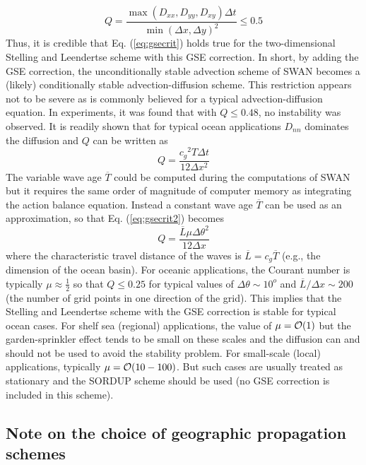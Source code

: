 \documentclass[12pt]{book}
\begin{document}
\begin{equation}
  Q = \frac{\max(D_{xx},D_{yy},D_{xy})\Delta t}{\min(\Delta x,\Delta y)^2} \leq 0.5
  \label{eq:gsecrit}
\end{equation}
Thus, it is credible that Eq. (\ref{eq:gsecrit}) holds true for the two-dimensional Stelling and Leendertse scheme with this GSE correction.
In short, by adding the GSE correction, the unconditionally stable advection scheme of
SWAN becomes a (likely) conditionally stable advection-diffusion scheme.
This restriction appears not to be severe as is commonly believed for a typical advection-diffusion equation.
In experiments,
it was found that with $Q \leq 0.48$, no instability was observed. It is readily shown that for typical ocean applications $D_{nn}$ dominates the
diffusion and $Q$ can be written as
\begin{equation}
  Q = \frac{{c_g}^2 T \Delta t}{12 \Delta x^2}
  \label{eq:gsecrit2}
\end{equation}
The variable wave age $\overline{T}$ could be computed during the computations of SWAN but it requires the same order of magnitude of computer memory as
integrating the action balance equation. Instead a constant wave age $\overline{T}$ can be used as an approximation, so that Eq. (\ref{eq:gsecrit2})
becomes
\begin{equation}
  Q = \frac{{\overline L} \mu \Delta \theta^2}{12 \Delta x}
\end{equation}
where the characteristic travel distance of the waves is ${\overline L} = {c_g}{\overline T}$ (e.g., the dimension of the ocean basin). For
oceanic applications, the Courant number is typically $\mu \approx \frac{1}{2}$ so that $Q \leq 0.25$ for typical values of $\Delta \theta \sim 10^o$ and
${\overline L}/\Delta x \sim 200$ (the number of grid points in one direction of the grid). This implies that the Stelling and Leendertse scheme with the
GSE correction is stable for typical ocean cases. For shelf sea (regional) applications, the value of $\mu = {\cal O} (1)$ but the garden-sprinkler
effect tends to be small on these scales and the diffusion can and should not be used to avoid the stability problem. For small-scale (local)
applications, typically $\mu = {\cal O} (10-100)$. But such cases are usually treated as stationary and the SORDUP scheme should be used (no GSE
correction is included in this scheme).

\subsection{Note on the choice of geographic propagation schemes}
\end{document}
